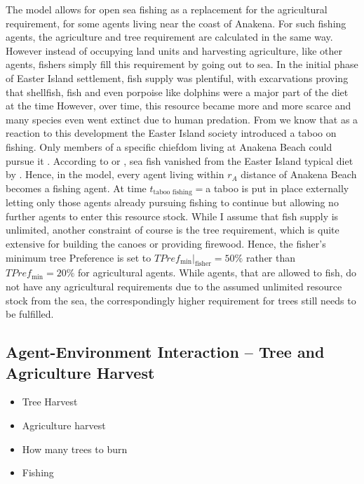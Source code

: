 The model allows for open sea fishing as a replacement for the agricultural requirement, for some agents living near the coast of Anakena.
For such fishing agents, the agriculture and tree requirement are calculated in the same way. However instead of occupying land units and harvesting agriculture, like other agents, fishers simply fill this requirement by going out to sea. 
In the initial phase of Easter Island settlement, fish supply was plentiful, with excarvations proving that shellfish, fish and even porpoise like dolphins were a major part of the diet at the time \citep{Bahn2017}
However, over time, this resource became more and more scarce and many species even went extinct due to human predation. 
From \TODO we know that as a reaction to this development the Easter Island society introduced a taboo on fishing. 
Only members of a specific chiefdom living at Anakena Beach could pursue it . 
According to \citet{Bahn2017} or \citet{Diamond2005}, sea fish vanished from the Easter Island typical diet by \TODO.
Hence, in the model, every agent living within $r_A$ distance of Anakena Beach becomes a fishing agent.
At time $t_\text{taboo fishing}=$\TODO a taboo is put in place externally letting only \TODO those agents already pursuing fishing to continue but allowing no further agents to enter this resource stock. 
While I assume that fish supply is unlimited, another constraint of course is the tree requirement, which is quite extensive for building the canoes or providing firewood. Hence, the fisher's minimum tree Preference is set to $TPref_\text{min}|_\text{fisher} = 50\%$ rather than $TPref_{\text{min}} = 20\%$ for agricultural agents.
While agents, that are allowed to fish, do not have any agricultural requirements due to the assumed unlimited resource stock from the sea, the correspondingly higher requirement for trees still needs to be fulfilled.

\subsection{Agent-Environment Interaction -- Tree and Agriculture Harvest}\label{sec:Harvest}
\begin{itemize}
	\item Tree Harvest
	\item Agriculture harvest
	\item How many trees to burn
	\item Fishing 
\end{itemize}

